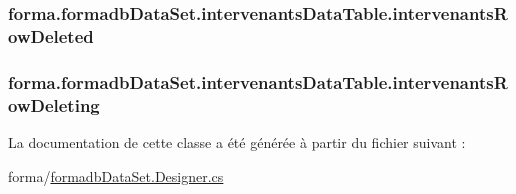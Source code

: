 \subsubsection[{\texorpdfstring{intervenants\+Row\+Deleted}{intervenantsRowDeleted}}]{ forma.\+formadb\+Data\+Set.\+intervenants\+Data\+Table.\+intervenants\+Row\+Deleted}\hypertarget{classforma_1_1formadb_data_set_1_1intervenants_data_table_a1be93fd32f8d4a6ff12d7a815f889b59}{}\label{classforma_1_1formadb_data_set_1_1intervenants_data_table_a1be93fd32f8d4a6ff12d7a815f889b59}
\subsubsection[{\texorpdfstring{intervenants\+Row\+Deleting}{intervenantsRowDeleting}}]{ forma.\+formadb\+Data\+Set.\+intervenants\+Data\+Table.\+intervenants\+Row\+Deleting}\hypertarget{classforma_1_1formadb_data_set_1_1intervenants_data_table_a493dc1e07d9ed90afcc3dfad45ddf743}{}\label{classforma_1_1formadb_data_set_1_1intervenants_data_table_a493dc1e07d9ed90afcc3dfad45ddf743}


La documentation de cette classe a été générée à partir du fichier suivant \+:\begin{DoxyCompactItemize}
\item 
forma/\hyperlink{formadb_data_set_8_designer_8cs}{formadb\+Data\+Set.\+Designer.\+cs}\end{DoxyCompactItemize}
